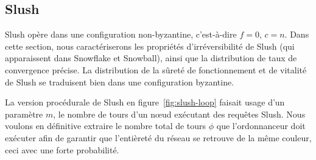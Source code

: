 \documentclass[letterpaper,twocolumn,10pt]{article}
\theoremstyle{definition}
\begin{document}
\begin{appendices}
\subsection{Slush}
Slush opère dans une configuration non-byzantine, c'est-à-dire $f = 0$, $c = n$.
Dans cette section, nous caractériserons les propriétés d'irréversibilité de Slush (qui apparaissent dans Snowflake et Snowball), ainsi que la distribution de taux de convergence précise. La distribution de la sûreté de fonctionnement et de vitalité de Slush se traduisent bien dans une configuration byzantine.


La version procédurale de Slush en figure~\ref{fig:slush-loop} faisait usage d'un paramètre $m$, le nombre de tours d'un nœud exécutant des requêtes Slush.
Nous voulons en définitive extraire le nombre total de tours $\phi$ que l'ordonnanceur doit exécuter afin de garantir que l'entièreté du réseau se retrouve de la même couleur, ceci avec une forte probabilité.


\end{appendices}
\end{document}
